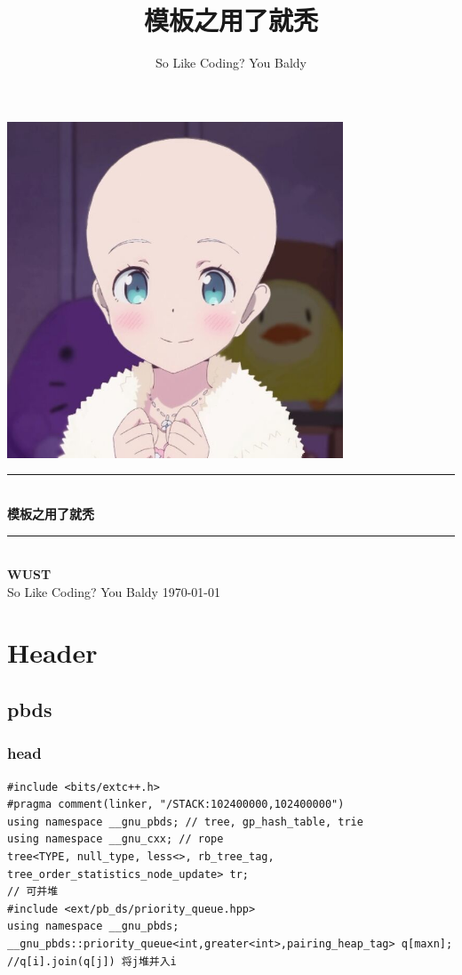 \documentclass[twoside]{article}
\title{模板之用了就秃}
\author{So Like Coding? You Baldy}
\newcommand{\HRule}{\rule{\linewidth}{0.5mm}}
\begin{document}
\small
\begin{titlepage}
\begin{center}
\vspace*{0.5cm}\includegraphics[width=0.75\textwidth]{logo.jpg} \\ [2cm]
\HRule \\ [1cm]
\textbf{\Huge{模板之用了就秃}} \\ [0.5cm]
\HRule \\ [1cm]
\textbf{\Huge{WUST}} \\ [1cm]
\LARGE{So Like Coding? You Baldy}
\vfill
\Large{\today}
\end{center}
\clearpage
\end{titlepage}
\tableofcontents\clearpage
\pagestyle{fancy}
\lfoot{}
\cfoot{\thepage}\rfoot{}
\setcounter{section}{-1}
\setcounter{page}{1}
\clearpage\section{Header}
\subsection{pbds}
\subsubsection{head}
\begin{lstlisting}
#include <bits/extc++.h>
#pragma comment(linker, "/STACK:102400000,102400000")
using namespace __gnu_pbds; // tree, gp_hash_table, trie
using namespace __gnu_cxx; // rope
tree<TYPE, null_type, less<>, rb_tree_tag, tree_order_statistics_node_update> tr;
// 可并堆
#include <ext/pb_ds/priority_queue.hpp>
using namespace __gnu_pbds;
__gnu_pbds::priority_queue<int,greater<int>,pairing_heap_tag> q[maxn];
//q[i].join(q[j]) 将j堆并入i
 \end{lstlisting}
\end{document}
